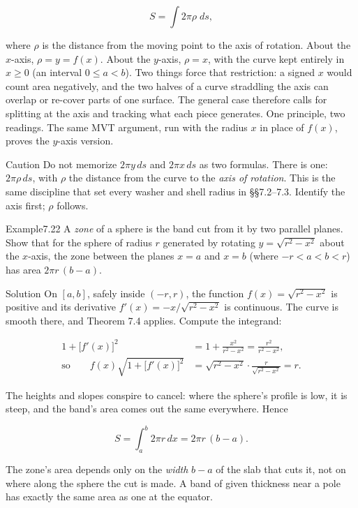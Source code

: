 \documentclass[a4paper,12pt,oneside]{memoir}
\begin{document}
\[ S = \int 2\pi \rho\;ds, \]

where \(\rho\) is the distance from the moving point to the axis of rotation. About the \(x\)-axis, \(\rho = y = f(x)\). About the \emph{\(y\)}-axis, \(\rho = x\), with the curve kept entirely in \(x \ge 0\) (an interval \(0 \le a < b\)). Two things force that restriction: a signed \(x\) would count area negatively, and the two halves of a curve straddling the axis can overlap or re-cover parts of one surface. The general case therefore calls for splitting at the axis and tracking what each piece generates. One principle, two readings. The same MVT argument, run with the radius \(x\) in place of \(f(x)\), proves the \(y\)-axis version.

\begin{envcaution}{Caution}{}{}
Do not memorize \(2\pi y\,ds\) and \(2\pi x\,ds\) as two formulas. There is one: \(2\pi \rho\,ds\), with \(\rho\) the distance from the curve to the \emph{axis of rotation}. This is the same discipline that set every washer and shell radius in §§7.2–7.3. Identify the axis first; \(\rho\) follows.
\end{envcaution}
\begin{workedexample}
\begin{envexample}{Example}{7.22}{}
A \emph{zone} of a sphere is the band cut from it by two parallel planes. Show that for the sphere of radius \(r\) generated by rotating \(y = \sqrt{r^{2} - x^{2}}\) about the \(x\)-axis, the zone between the planes \(x = a\) and \(x = b\) (where \(-r < a < b < r\)) has area \(2\pi r\,(b - a)\).
\end{envexample}
\begin{envsolution}{Solution}{}{}
On \([a, b]\), safely inside \((-r, r)\), the function \(f(x) = \sqrt{r^{2} - x^{2}}\) is positive and its derivative \(f'(x) = -x/\sqrt{r^{2} - x^{2}}\) is continuous. The curve is smooth there, and Theorem 7.4 applies. Compute the integrand:

\[ \begin{aligned}
          1 + \bigl[f'(x)\bigr]^{2} &= 1 + \frac{x^{2}}{r^{2} - x^{2}} = \frac{r^{2}}{r^{2} - x^{2}}, \\[2pt]
          \text{so}\qquad f(x)\sqrt{1 + \bigl[f'(x)\bigr]^{2}} &= \sqrt{r^{2} - x^{2}}\cdot\frac{r}{\sqrt{r^{2} - x^{2}}} = r.
        \end{aligned} \]

The heights and slopes conspire to cancel: where the sphere’s profile is low, it is steep, and the band’s area comes out the same everywhere. Hence

\[ S = \int_{a}^{b} 2\pi r\,dx = 2\pi r\,(b - a). \]

The zone’s area depends only on the \emph{width} \(b - a\) of the slab that cuts it, not on where along the sphere the cut is made. A band of given thickness near a pole has exactly the same area as one at the equator. \qedmark
\end{envsolution}
\end{workedexample}
\end{document}
